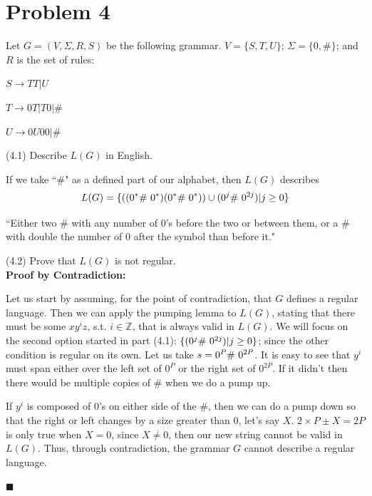 \documentclass[11pt]{article}
\begin{document}
\newpage

\section*{Problem 4}

\noindent
Let $G=(V,\Sigma,R,S)$ be the following grammar. $V=\{S,T,U\}$;
$\Sigma=\{0,\#\}$; and $R$ is the set of rules:

$S\rightarrow TT|U$

$T\rightarrow 0T|T0|\#$

$U\rightarrow 0U00|\#$
\newline

\noindent
(4.1) Describe $L(G)$ in English.

If we take ``$\#$" as a defined part of our alphabet, then $L(G)$ describes
\[L(G) = \{((0^*\# \hphantom{l} 0^*)(0^*\# \hphantom{l} 0^*))\cup (0^j \# \hphantom{l} 0^{2j}) | j \geq 0\}\]

``Either two $\#$ with any number of $0$'s before the two or between them, or a $\#$ with double the number of $0$ after the symbol than before it."\\
\newline

\noindent
(4.2) Prove that $L(G)$ is not regular.\\

\textbf{Proof by Contradiction:}

Let us start by assuming, for the point of contradiction, that $G$ defines a regular language. Then we can apply the pumping lemma to $L(G)$, stating that there must be some $xy^i z$, s.t. $i\in \mathbb{Z}$, that is always valid in $L(G)$. We will focus on the second option started in part (4.1):  $\{(0^j \# \hphantom{l} 0^{2j}) | j \geq 0\}$; since the other condition is regular on its own. Let us take $s = 0^P\# \hphantom{l} 0^{2P}$. It is easy to see that $y^i$ must span either over the left set of $0^P$ or the right set of $0^{2P}$. If it didn't then there would be multiple copies of $\#$ when we do a pump up.

If $y^i$ is composed of $0$'s on either side of the $\#$, then we can do a pump down so that the right or left changes by a size greater than 0, let's say $X$. $2 \times P \pm X = 2P$ is only true when $X =0$, since $X \neq 0$, then our new string cannot be valid in $L(G)$. Thus, through contradiction, the grammar $G$ cannot describe a regular language. 
 
\begin{flushright}$\blacksquare$\end{flushright}
\end{document}
